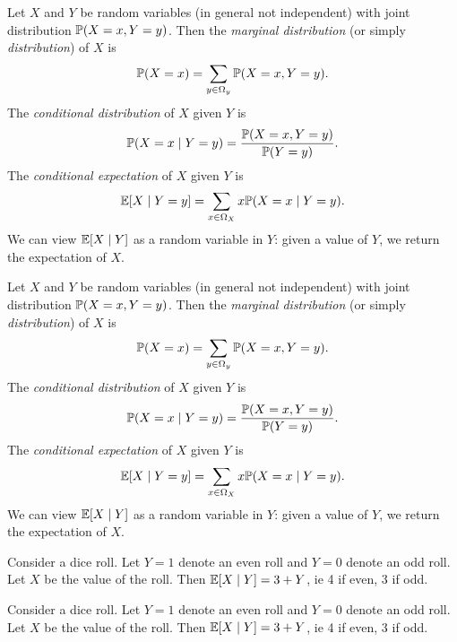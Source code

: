 \begin{note}
  \begin{field}
    \begin{defi}
      Let $X$ and $Y$ be random variables (in general not independent) with joint distribution $\P(X = x, Y = y)$. Then the \emph{marginal distribution} (or simply \emph{distribution}) of $X$ is
      \[
        \P(X = x) = \sum_{y\in \Omega_y}\P(X = x, Y = y).
      \]
      The \emph{conditional distribution} of $X$ given $Y$ is
      \[
        \P(X = x\mid Y = y) = \frac{\P(X = x, Y = y)}{\P(Y = y)}.
      \]
      The \emph{conditional expectation} of $X$ given $Y$ is
      \[
        \E[X\mid Y = y] = \sum_{x\in \Omega_X}x\P(X = x\mid Y = y).
      \]
      We can view $\E[X\mid Y]$ as a random variable in $Y$: given a value of $Y$, we return the expectation of $X$.
    \end{defi}
  \end{field}
  \begin{field}
    \begin{defi}
      Let $X$ and $Y$ be random variables (in general not independent) with joint distribution $\P(X = x, Y = y)$. Then the \emph{marginal distribution} (or simply \emph{distribution}) of $X$ is
      \[
        \P(X = x) = \sum_{y\in \Omega_y}\P(X = x, Y = y).
      \]
      The \emph{conditional distribution} of $X$ given $Y$ is
      \[
        \P(X = x\mid Y = y) = \frac{\P(X = x, Y = y)}{\P(Y = y)}.
      \]
      The \emph{conditional expectation} of $X$ given $Y$ is
      \[
        \E[X\mid Y = y] = \sum_{x\in \Omega_X}x\P(X = x\mid Y = y).
      \]
      We can view $\E[X\mid Y]$ as a random variable in $Y$: given a value of $Y$, we return the expectation of $X$.
    \end{defi}
  \end{field}
  \xplain{}%
\end{note}

\begin{note}
  \begin{field}
    \begin{eg}
      Consider a dice roll. Let $Y = 1$ denote an even roll and $Y = 0$ denote an odd roll. Let $X$ be the value of the roll. Then $\E[X\mid Y] = 3 + Y$, ie 4 if even, 3 if odd.
    \end{eg}
  \end{field}
  \begin{field}
    \begin{eg}
      Consider a dice roll. Let $Y = 1$ denote an even roll and $Y = 0$ denote an odd roll. Let $X$ be the value of the roll. Then $\E[X\mid Y] = 3 + Y$, ie 4 if even, 3 if odd.
    \end{eg}
  \end{field}
  \xplain{}%
\end{note}

